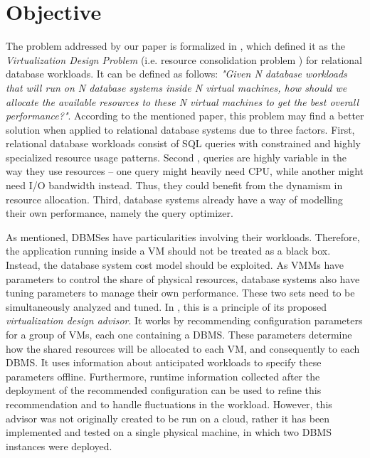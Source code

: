 \section{Objective}

The problem addressed by our paper is formalized in \cite{4401021}, which defined it as the \textit{Virtualization Design Problem} (i.e. resource consolidation problem ) for relational database workloads. It can be defined as follows: \textit{"Given N database workloads that will run on N database systems inside N virtual 
machines, how should we allocate the available resources to these N virtual machines to get the best overall performance?"}. According to the mentioned paper, this problem may find a better solution when applied to relational database systems due to three factors. First, relational database workloads consist of SQL queries with constrained and highly specialized resource usage patterns. Second , queries are highly variable in the way they use resources -- one query might heavily need CPU, while another might need I/O bandwidth instead. Thus, they could benefit from the dynamism in resource allocation. Third, database systems already have a way of modelling their own performance, namely the query optimizer.

As mentioned, DBMSes have particularities involving their workloads. Therefore, the application running inside a VM should not be treated as a black box. Instead, the database system cost model should be exploited. As VMMs have parameters to control the share of physical resources, database systems also have tuning parameters to manage their own performance. These two sets need to be simultaneously analyzed and tuned. In \cite{Soror:2008:AVM:1376616.1376711}, this is a principle of its proposed \textit{virtualization design advisor}. It works by recommending configuration parameters for a group of VMs, each one containing a DBMS. These parameters determine how the shared resources will be allocated to each VM, and consequently to each DBMS. It uses information about anticipated workloads to specify these parameters offline. Furthermore, runtime information collected after the deployment of the recommended configuration can be used to refine this recommendation and to handle fluctuations in the workload. However, this advisor was not originally created to be run on a cloud, rather it has been implemented and tested on a single physical machine, in which two DBMS instances were deployed.

